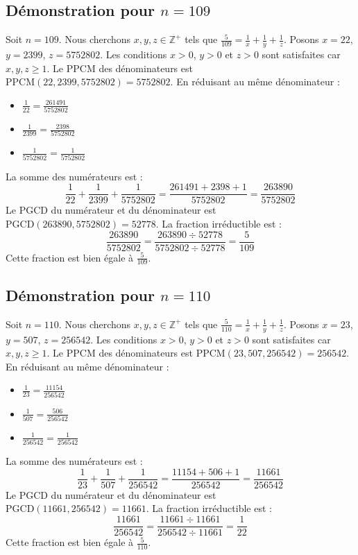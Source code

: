 \documentclass[11pt,a4paper]{article}
\begin{document}
\subsection{Démonstration pour $n = 109$}
Soit $n = 109$. Nous cherchons $x, y, z \in \mathbb{Z}^{+}$ tels que $\frac{5}{109} = \frac{1}{x} + \frac{1}{y} + \frac{1}{z}$.
Posons $x = 22$, $y = 2399$, $z = 5752802$.
Les conditions $x > 0$, $y > 0$ et $z > 0$ sont satisfaites car $x, y, z \geq 1$.
Le PPCM des dénominateurs est $\text{PPCM}(22, 2399, 5752802) = 5752802$.
En réduisant au même dénominateur :
\begin{itemize}
    \item $\frac{1}{22} = \frac{261491}{5752802}$
    \item $\frac{1}{2399} = \frac{2398}{5752802}$
    \item $\frac{1}{5752802} = \frac{1}{5752802}$
\end{itemize}
La somme des numérateurs est :
$$ \frac{1}{22} + \frac{1}{2399} + \frac{1}{5752802} = \frac{261491 + 2398 + 1}{5752802} = \frac{263890}{5752802} $$
Le PGCD du numérateur et du dénominateur est $\text{PGCD}(263890, 5752802) = 52778$.
La fraction irréductible est :
$$ \frac{263890}{5752802} = \frac{263890 \div 52778}{5752802 \div 52778} = \frac{5}{109} $$
Cette fraction est bien égale à $\frac{5}{109}$.

\subsection{Démonstration pour $n = 110$}
Soit $n = 110$. Nous cherchons $x, y, z \in \mathbb{Z}^{+}$ tels que $\frac{5}{110} = \frac{1}{x} + \frac{1}{y} + \frac{1}{z}$.
Posons $x = 23$, $y = 507$, $z = 256542$.
Les conditions $x > 0$, $y > 0$ et $z > 0$ sont satisfaites car $x, y, z \geq 1$.
Le PPCM des dénominateurs est $\text{PPCM}(23, 507, 256542) = 256542$.
En réduisant au même dénominateur :
\begin{itemize}
    \item $\frac{1}{23} = \frac{11154}{256542}$
    \item $\frac{1}{507} = \frac{506}{256542}$
    \item $\frac{1}{256542} = \frac{1}{256542}$
\end{itemize}
La somme des numérateurs est :
$$ \frac{1}{23} + \frac{1}{507} + \frac{1}{256542} = \frac{11154 + 506 + 1}{256542} = \frac{11661}{256542} $$
Le PGCD du numérateur et du dénominateur est $\text{PGCD}(11661, 256542) = 11661$.
La fraction irréductible est :
$$ \frac{11661}{256542} = \frac{11661 \div 11661}{256542 \div 11661} = \frac{1}{22} $$
Cette fraction est bien égale à $\frac{5}{110}$.
\end{document}

